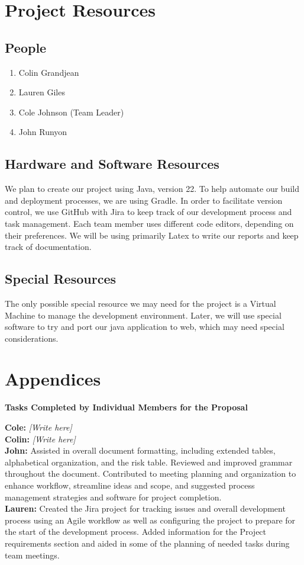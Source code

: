 \documentclass[english,12pt]{article}
\begin{document}
\section{Project Resources}

\subsection{People}
\begin{enumerate}
  \item Colin Grandjean 
  \item Lauren Giles   
  \item Cole Johnson (Team Leader)
  \item John Runyon    
\end{enumerate}
\subsection{Hardware and Software Resources}
We plan to create our project using Java, version 22. 
To help automate our build and deployment processes, we are using Gradle. 
In order to facilitate version control, we use GitHub with Jira to keep track of our 
development process and task management. Each team member uses different 
code editors, depending on their preferences. We will be using primarily Latex to
write our reports and keep track of documentation.

\subsection{Special Resources}
The only possible special resource we may need for the project is a Virtual Machine 
to manage the development environment. Later, we will use
special software to try and port our java application to web, which may need
special considerations.
\section{Appendices}  

\begin{center}
\textbf{Tasks Completed by Individual Members for the Proposal}
\end{center}

\noindent
\textbf{Cole:} \textit{[Write here]} \\

\textbf{Colin:} \textit{[Write here]} \\

\textbf{John:} Assisted in overall document formatting, including extended tables, alphabetical organization, and the risk table. Reviewed and improved grammar throughout the document. Contributed to meeting planning and organization to enhance workflow, streamline ideas and scope, and suggested process management strategies and software for project completion. \\

\textbf{Lauren:} Created the Jira project for tracking issues and overall development process using an Agile workflow as well as configuring the project to prepare for the start of the development process. Added information for the Project requirements section and aided in some of the planning of needed tasks during team meetings.
\end{document}

